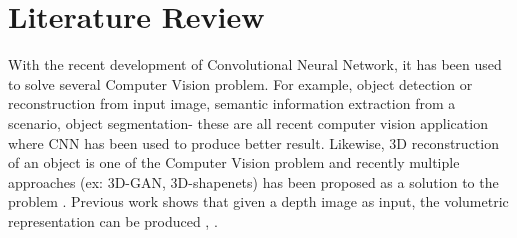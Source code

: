 \documentclass[11pt]{article}       %
\begin{document}
\section{Literature Review} \label{litrev}

With the recent development of Convolutional Neural Network, it has been used to solve several Computer Vision problem. For example, object detection or reconstruction from input image, semantic information extraction from a scenario, object segmentation- these are all recent computer vision application where CNN has been used to produce better result. Likewise, 3D reconstruction of an object is one of the Computer Vision problem and recently multiple approaches (ex: 3D-GAN, 3D-shapenets) has been proposed as a solution to the problem \cite{dr1}. Previous work shows that given a depth image as input, the volumetric representation can be produced , \cite{dr2}.




\end{document}
